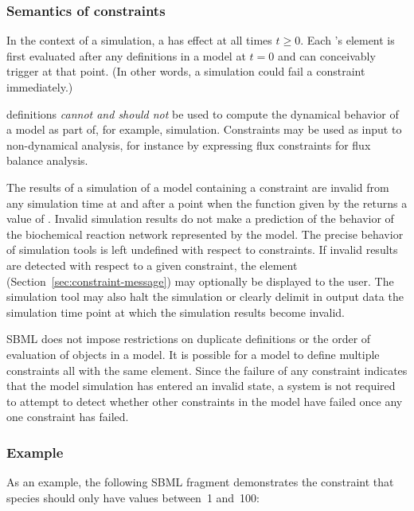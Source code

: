 \subsubsection{Semantics of constraints}
\label{sec:constraint-semantics}

In the context of a simulation, a \Constraint has effect at all
times $t \geq 0$.  Each \Constraint's  element is first
evaluated after any \InitialAssignment definitions in a model at
$t = 0$ and can conceivably trigger at that point.  (In other
words, a simulation could fail a constraint immediately.)

\Constraint definitions \emph{cannot and should not} be used to
compute the dynamical behavior of a model as part of, for example,
simulation.  Constraints may be used as input to non-dynamical
analysis, for instance by expressing flux constraints for flux
balance analysis.

The results of a simulation of a model containing a constraint are
invalid from any simulation time at and after a point when the
function given by the  returns a value of .
Invalid simulation results do not make a prediction of the
behavior of the biochemical reaction network represented by the
model.  The precise behavior of simulation tools is left undefined
with respect to constraints.  If invalid results are detected with
respect to a given constraint, the  element
(Section~\ref{sec:constraint-message}) may optionally be displayed
to the user.  The simulation tool may also halt the simulation or
clearly delimit in output data the simulation time point at which
the simulation results become invalid.

SBML does not impose restrictions on duplicate \Constraint
definitions or the order of evaluation of \Constraint objects in a
model.  It is possible for a model to define multiple constraints
all with the same  element.  Since the failure of any
constraint indicates that the model simulation has entered an
invalid state, a system is not required to attempt to detect
whether other constraints in the model have failed once any one
constraint has failed.


\subsubsection{Example}

As an example, the following SBML fragment demonstrates the
constraint that species  should only have values between~1
and~100:


